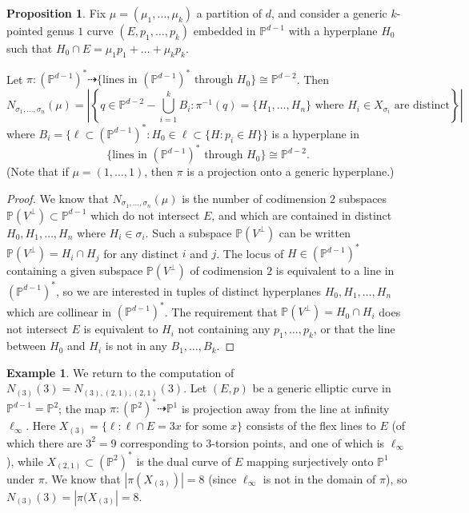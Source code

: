 \documentclass[thesis]{thesis-umich}           %
\renewcommand{\P}{\mathbb P}
\theoremstyle{definition}
\newtheorem{prop}[thm]{Proposition}
\newtheorem{eg}[thm]{Example}
\begin{document}
\begin{prop}
  \label{prop:direct}
  Fix $\mu=(\mu_1,\dots,\mu_k)$ a partition of $d$, and consider
  a generic $k$-pointed
  genus $1$ curve $(E,p_1,\dots,p_k)$ embedded in $\P^{d-1}$ with a hyperplane
  $H_0$ such that $H_0\cap E = \mu_1p_1+\dots+\mu_kp_k$.
  
  Let $\pi:(\P^{d-1})^*\dashrightarrow\{\text{lines in }(\P^{d-1})^*\text{ through }H_0\}\cong \P^{d-2}$. Then
  \[
  N_{\sigma_1,\dots,\sigma_n}(\mu)=\left|\left\{q\in\P^{d-2}-\bigcup_{i=1}^kB_i:\pi^{-1}(q)=\{H_1,\dots,H_n\}\text{ where }H_i\in X_{\sigma_i}\text{ are distinct}\right\}\right|
  \]
  where $B_i=\{\ell\subset(\P^{d-1})^*:H_0\in \ell\subset\{H:p_i\in H\}\}$ is a hyperplane in \[\{\text{lines in }(\P^{d-1})^*\text{ through }H_0\}\cong \P^{d-2}.\]
     (Note that if $\mu=(1,\dots,1)$, then $\pi$ is a projection onto a generic hyperplane.)
\end{prop}
\begin{proof}
  We know that $N_{\sigma_1,\dots,\sigma_n}(\mu)$ is the number of codimension $2$
  subspaces $\P(V^{\perp})\subset\P^{d-1}$ which do not intersect $E$, and which are contained in distinct $H_0,H_1,\dots,H_n$ where $H_i\in\sigma_i$. Such a subspace
  $\P(V^{\perp})$ can be written $\P(V^{\perp})=H_i\cap H_j$ for any distinct $i$
  and $j$.
  The locus of $H\in(\P^{d-1})^*$ containing
  a given subspace $\P(V^{\perp})$ of codimension $2$ is equivalent to a
  line in $(\P^{d-1})^*$, so we are interested in
  tuples of distinct hyperplanes $H_0,H_1,\dots,H_n$ which are collinear in
  $(\P^{d-1})^*$. The requirement that $\P(V^{\perp})=H_0\cap H_i$ does not intersect $E$ is equivalent to $H_i$ not containing any $p_1,\dots,p_k$, or that
  the line between $H_0$ and $H_i$ is not in any $B_1,\dots,B_k$.
\end{proof}

\begin{eg}
  We return to the computation of $N_{(3)}(3)=N_{(3),(2,1),(2,1)}(3)$. Let $(E,p)$
  be a generic elliptic curve in $\P^{d-1}=\P^2$; the map $\pi:(\P^2)^*\dashrightarrow \P^1$ is projection away from the line at infinity $\ell_{\infty}$.
  Here $X_{(3)}=\{\ell:\ell\cap E=3x\text{ for some }x\}$ consists of the flex lines to $E$ (of which there are $3^2=9$ corresponding to $3$-torsion points, and one of which is $\ell_{\infty}$), while $X_{(2,1)}\subset (\P^2)^*$ is the dual curve of $E$ mapping surjectively onto $\P^1$ under $\pi$. We know that $|\pi(X_{(3)})|=8$ (since $\ell_{\infty}$ is not in the domain of $\pi$), so $N_{(3)}(3)=|\pi(X_{(3)}|=8$.
  \end{eg}
\end{document}
